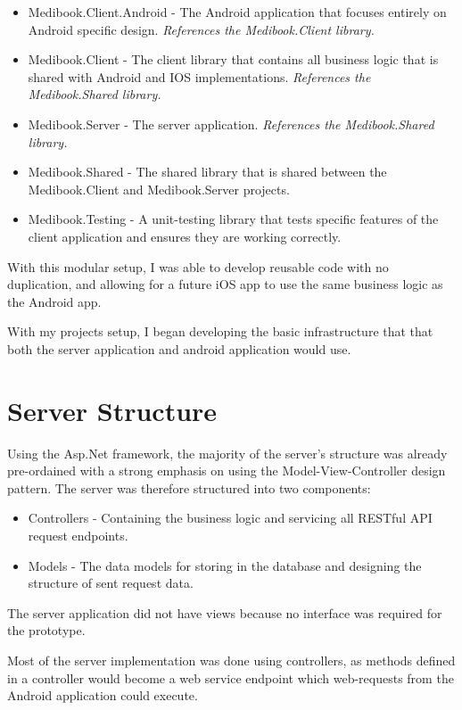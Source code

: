 \begin{itemize}
	\item Medibook.Client.Android - The Android application that focuses entirely on Android specific design. \textit{References the Medibook.Client library.}
	\item Medibook.Client - The client library that contains all business logic that is shared with Android and IOS implementations. \textit{References the Medibook.Shared library.}
	\item Medibook.Server - The server application. \textit{References the Medibook.Shared library.}
	\item Medibook.Shared - The shared library that is shared between the Medibook.Client and Medibook.Server projects.
	\item Medibook.Testing - A unit-testing library that tests specific features of the client application and ensures they are working correctly.
\end{itemize}

With this modular setup, I was able to develop reusable code with no duplication, and allowing for a future iOS app to use the same business logic as the Android app.

With my projects setup, I began developing the basic infrastructure that that both the server application and android application would use.

\section{Server Structure}

Using the Asp.Net framework, the majority of the server's structure was already pre-ordained with a strong emphasis on using the Model-View-Controller design pattern. The server was therefore structured into two components:

\begin{itemize}
	\item Controllers - Containing the business logic and servicing all RESTful API request endpoints.
	\item Models - The data models for storing in the database and designing the structure of sent request data.
\end{itemize}

The server application did not have views because no interface was required for the prototype.

Most of the server implementation was done using controllers, as methods defined in a controller would become a web service endpoint which web-requests from the Android application could execute.

